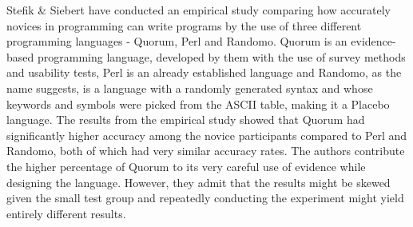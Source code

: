 Stefik \& Siebert \cite{QuorumRandomo} have conducted an empirical study comparing how accurately novices in programming can write programs by the use of three different programming languages - Quorum, Perl and Randomo. Quorum is an evidence-based programming language, developed by them with the use of survey methods and usability tests, Perl is an already established language and Randomo, as the name suggests, is a language with a randomly generated syntax and whose keywords and symbols were picked from the ASCII table, making it a Placebo language. The results from the empirical study showed that Quorum had significantly higher accuracy among the novice participants compared to Perl and Randomo, both of which had very similar accuracy rates. The authors contribute the higher percentage of Quorum to its very careful use of evidence while designing the language. However, they admit that the results might be skewed given the small test group and repeatedly conducting the experiment might yield entirely different results.






   